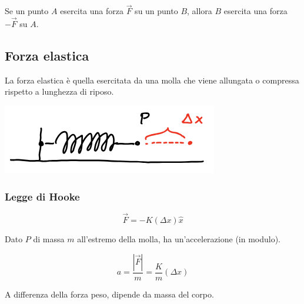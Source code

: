 \documentclass{subfiles}
\begin{document}
Se un punto $A$ esercita una forza $\vec{F}$ su un punto $B$, allora $B$ esercita una forza $-\vec{F}$ su $A$.

\subsection{Forza elastica}

La forza elastica è quella esercitata da una molla che viene allungata o compressa rispetto a lunghezza di riposo.

\includegraphics[width=\columnwidth]{esempio-forza-elastica}

\subsubsection{Legge di Hooke}

$$
\vec{F} = -K(\Delta x) \hat{x}
$$

\noindent
Dato $P$ di massa $m$ all'estremo della molla, ha un'accelerazione (in modulo).

$$
a = \frac{|\vec{F}|}{m} = \frac{K}{m}(\Delta x)
$$

\noindent
A differenza della forza peso, dipende da massa del corpo.
\end{document}
